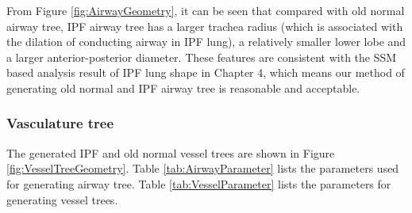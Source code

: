 From Figure \ref{fig:AirwayGeometry}, it can be seen that compared with old normal airway tree, IPF airway tree has a larger trachea radius (which is associated with the dilation of conducting airway in IPF lung), a relatively smaller lower lobe and a larger anterior-posterior diameter. These features are consistent with the SSM based analysis result of IPF lung shape in Chapter 4, which means our method of generating old normal and IPF airway tree is reasonable and acceptable.

\subsubsection{Vasculature tree}
The generated IPF and old normal vessel trees are shown in Figure \ref{fig:VesselTreeGeometry}. Table \ref{tab:AirwayParameter} lists the parameters used for generating airway tree. Table \ref{tab:VesselParameter} lists the parameters for generating vessel trees. 

